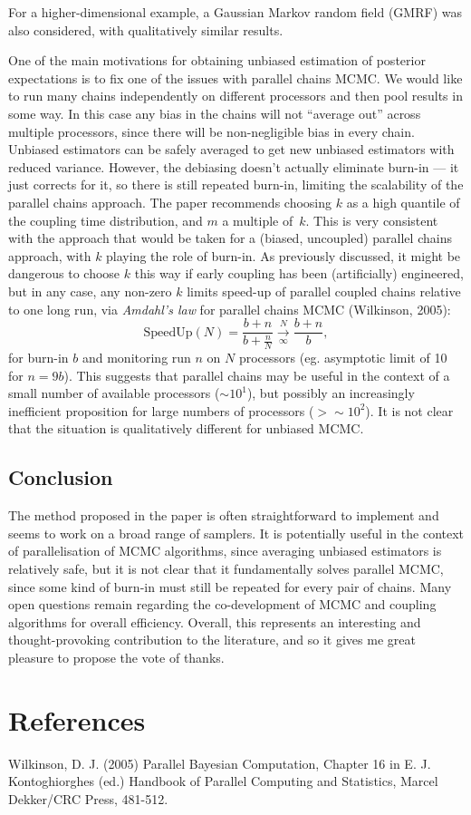 \documentclass[11pt,a4paper]{article}
\begin{document}
For a higher-dimensional example, a Gaussian Markov random field (GMRF) was also considered, with qualitatively similar results.

One of the main motivations for obtaining unbiased estimation of posterior expectations is to fix one of the issues with parallel chains MCMC.
We would like to run many chains independently on different processors and then pool results in some way.
In this case any bias in the chains will not ``average out'' across multiple processors, since there will be non-negligible bias in every chain.
Unbiased estimators can be safely averaged to get new unbiased estimators with reduced variance.
However, the debiasing doesn't actually eliminate burn-in --- it just corrects for it, so there is still repeated burn-in, limiting the scalability of the parallel chains approach. The paper recommends choosing $k$ as a high quantile of the coupling time distribution, and $m$ a multiple of~$k$. This is very consistent with the approach that would be taken for a (biased, uncoupled) parallel chains approach, with $k$ playing the role of burn-in. As previously discussed, it might be dangerous to choose $k$ this way if early coupling has been (artificially) engineered, but in any case, any non-zero $k$ limits speed-up of parallel coupled chains relative to one long run, via \emph{Amdahl's law} for parallel chains MCMC (Wilkinson, 2005):
    \[
\text{SpeedUp}(N) = \frac{b+n}{b+\frac{n}{N}} \overset{N}{\underset{\infty}{\longrightarrow}} \frac{b+n}{b},
    \]
    for burn-in $b$ and monitoring run $n$ on $N$ processors (eg. asymptotic limit of 10 for $n=9b$). This suggests that parallel chains may be useful in the context of a small number of available processors ($\sim 10^1$), but possibly an increasingly inefficient proposition for large numbers of processors ($>\sim 10^{2}$). It is not clear that the situation is qualitatively different for unbiased MCMC.

  \subsection*{Conclusion}
 The method proposed in the paper is often straightforward to implement and seems to work on a broad range of samplers.
It is potentially useful in the context of parallelisation of MCMC algorithms, since averaging unbiased estimators is relatively safe, but it is not clear that it fundamentally solves parallel MCMC, since some kind of burn-in must still be repeated for every pair of chains.
Many open questions remain regarding the co-development of MCMC and coupling algorithms for overall efficiency.
Overall, this represents an interesting and thought-provoking contribution to the literature, and so it gives me great pleasure to propose the vote of thanks.

  \section*{References}

  \begin{description}
\item Wilkinson, D. J. (2005) Parallel Bayesian Computation, Chapter 16 in E. J. Kontoghiorghes (ed.) Handbook of Parallel Computing and Statistics, Marcel Dekker/CRC Press, 481-512.
    \end{description}
  
\end{document}
